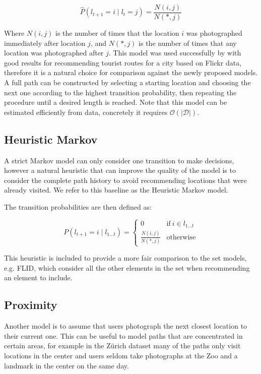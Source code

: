 \begin{equation}
  \hat{P}(l_{t+1} = i \mid l_{t} = j) = \frac{N(i,j)}{N(*,j)}
\end{equation}

Where $N(i,j)$ is the number of times that the location $i$ was photographed immediately after location $j$, and $N(*, j)$ is the number of times that any location was photographed after $j$. This model was used successfully by \citet{Kurashima2010} with good results for recommending tourist routes for a city based on Flickr data, therefore it is a natural choice for comparison against the newly proposed models. A full path can be constructed by selecting a starting location and choosing the next one according to the highest transition probability, then repeating the procedure until a desired length is reached. Note that this model can be estimated efficiently from data, concretely it requires $\mathcal{O}(|\mathcal{D}|)$.

\subsection{Heuristic Markov}

A strict Markov model can only consider one transition to make decisions, however a natural heuristic that can improve the quality of the model is to consider the complete path history to avoid recommending locations that were already visited. We refer to this baseline as the Heuristic Markov model.

The transition probabilities are then defined as:

\begin{equation}
  P(l_{t+1} = i \mid l_{1 \dots t}) = \begin{cases}
  0 & \text{if}\ i \in l_{1 \dots t} \\
  \frac{N(i,j)}{N(*,j)} & \text{otherwise}
  \end{cases}
\end{equation}

This heuristic is included to provide a more fair comparison to the set models, e.g. FLID, which consider all the other elements in the set when recommending an element to include.

\subsection{Proximity}

Another model is to assume that users photograph the next closest location to their current one. This can be useful to model paths that are concentrated in certain areas, for example in the Zürich dataset many of the paths only visit locations in the center and users seldom take photographs at the Zoo and a landmark in the center on the same day.


